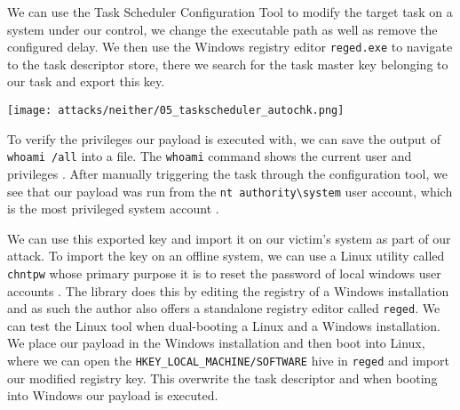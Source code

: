 We can use the Task Scheduler Configuration Tool to modify the target task on a system under our control, we change the executable path as well as remove the configured delay.
We then use the Windows registry editor \lstinline{reged.exe} to navigate to the task descriptor store, there we search for the task master key belonging to our task and export this key.

\texttt{[image: attacks/neither/05\_taskscheduler\_autochk.png]}

To verify the privileges our payload is executed with, we can save the output of \lstinline{whoami /all} into a file.
The \lstinline{whoami} command shows the current user and privileges \cite{microsoft-whoami}.
After manually triggering the task through the configuration tool, we see that our payload was run from the \lstinline{nt authority\system} user account, which is the most privileged system account \cite{microsoft-localsystem-account}.


We can use this exported key and import it on our victim's system as part of our attack.
To import the key on an offline system, we can use a Linux utility called \lstinline{chntpw} whose primary purpose it is to reset the password of local windows user accounts \cite{chntpw}.
The library does this by editing the registry of a Windows installation and as such the author also offers a standalone registry editor called \lstinline{reged}.
We can test the Linux tool when dual-booting a Linux and a Windows installation.
We place our payload in the Windows installation and then boot into Linux, where we can open the \lstinline{HKEY_LOCAL_MACHINE/SOFTWARE} hive in \lstinline{reged} and import our modified registry key.
This overwrite the task descriptor and when booting into Windows our payload is executed.

